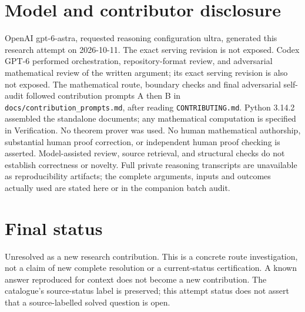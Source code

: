 \documentclass[11pt]{article}
\begin{document}
\section{Model and contributor disclosure}
OpenAI gpt-6-astra, requested reasoning configuration ultra, generated this research
attempt on 2026-10-11. The exact serving revision is not exposed. Codex GPT-6
performed orchestration, repository-format review, and adversarial mathematical review of the written argument; its exact serving revision
is also not exposed. The mathematical route, boundary checks and final adversarial
self-audit followed contribution prompts A then B in
\texttt{docs/contribution\_prompts.md}, after reading \texttt{CONTRIBUTING.md}.
Python 3.14.2 assembled the standalone documents; any mathematical computation is
specified in Verification. No theorem prover was used. No human mathematical
authorship, substantial human proof correction, or independent human proof checking
is asserted. Model-assisted review, source retrieval, and structural checks do not
establish correctness or novelty. Full private reasoning transcripts are unavailable
as reproducibility artifacts; the complete arguments, inputs and outcomes actually
used are stated here or in the companion batch audit.
\section{Final status}
Unresolved as a new research contribution. This is a concrete route investigation,
not a claim of new complete resolution or a current-status certification. A known
answer reproduced for context does not become a new contribution. The catalogue's
source-status label is preserved; this attempt status does not assert that a
source-labelled solved question is open.
\end{document}
